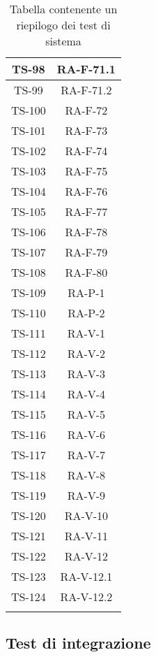 \begin{center}
\begin{longtable}{|c|c|}
			\hline
			TS-98 & RA-F-71.1 \\
			\hline
			TS-99 & RA-F-71.2 \\
			\hline
			TS-100 & RA-F-72 \\
			\hline
			TS-101 & RA-F-73 \\
			\hline
			TS-102 & RA-F-74 \\
			\hline
			TS-103 & RA-F-75 \\
			\hline
			TS-104 & RA-F-76 \\
			\hline
			TS-105 & RA-F-77 \\
			\hline
			TS-106 & RA-F-78 \\
			\hline
			TS-107 & RA-F-79 \\
			\hline
			TS-108 & RA-F-80 \\
			\hline
			TS-109 & RA-P-1 \\
			\hline
			TS-110 & RA-P-2 \\
			\hline
			TS-111 & RA-V-1 \\
			\hline
			TS-112 & RA-V-2 \\
			\hline
			TS-113 & RA-V-3 \\
			\hline
			TS-114 & RA-V-4 \\
			\hline
			TS-115 & RA-V-5 \\
			\hline
			TS-116 & RA-V-6 \\
			\hline
			TS-117 & RA-V-7 \\
			\hline
			TS-118 & RA-V-8 \\
			\hline
			TS-119 & RA-V-9 \\
			\hline
			TS-120 & RA-V-10 \\
			\hline
			TS-121 & RA-V-11 \\
			\hline
			TS-122 & RA-V-12 \\
			\hline
			TS-123 & RA-V-12.1 \\
			\hline
			TS-124 & RA-V-12.2 \\
			\hline

			\caption{Tabella contenente un riepilogo dei test di sistema}
			\end{longtable}
		\end{center}

	\subsection{Test di integrazione}

